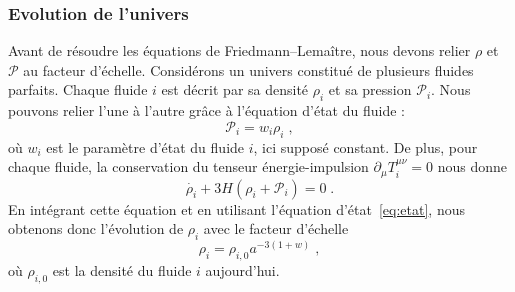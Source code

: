 \subsubsection{Evolution de l'univers}
Avant de résoudre les équations de Friedmann–Lemaître, nous devons relier $\rho$ et $\mathcal{P}$ au facteur d'échelle. Considérons un univers constitué de plusieurs fluides parfaits. Chaque fluide $i$ est décrit par sa densité $\rho_i$ et sa pression $\mathcal{P}_i$. Nous pouvons relier l'une à l'autre grâce à l'équation d'état du fluide :
\begin{equation}
  \label{eq:etat}
  \mathcal{P}_i = w_i \rho_i \; ,
\end{equation}
où $w_i$ est le paramètre d'état du fluide $i$, ici supposé constant.
De plus, pour chaque fluide, la conservation du tenseur énergie-impulsion $\partial_{\mu} T_i^{\mu \nu} = 0$ nous donne
\begin{equation}
  \label{eq:conservation}
  \dot{\rho_i} + 3 H (\rho_i + \mathcal{P}_i) = 0  \; .
\end{equation}
En intégrant cette équation et en utilisant l'équation d'état~\ref{eq:etat}, nous obtenons donc l'évolution de $\rho_i$ avec le facteur d'échelle
\begin{equation}
  \label{eq:rho_vs_a}
  \rho_i = \rho_{i,0} a^{-3(1+w)}  \; ,
\end{equation}
où $\rho_{i,0}$ est la densité du fluide $i$ aujourd'hui.

